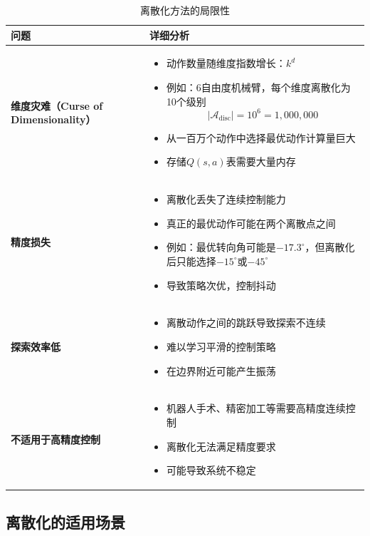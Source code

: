 \begin{table}[H]
\centering
\caption{离散化方法的局限性}
\begin{tabular}{p{}p{}}
\toprule
\textbf{问题} & \textbf{详细分析} \\
\midrule
\textbf{维度灾难（Curse of Dimensionality）} & 
\begin{itemize}
    \item 动作数量随维度指数增长：$k^d$
    \item 例如：6自由度机械臂，每个维度离散化为10个级别
    \[
    |\mathcal{A}_{\text{disc}}| = 10^6 = 1,000,000
    \]
    \item 从一百万个动作中选择最优动作计算量巨大
    \item 存储$Q(s,a)$表需要大量内存
\end{itemize} \\
\hline
\textbf{精度损失} & 
\begin{itemize}
    \item 离散化丢失了连续控制能力
    \item 真正的最优动作可能在两个离散点之间
    \item 例如：最优转向角可能是$-17.3^\circ$，但离散化后只能选择$-15^\circ$或$-45^\circ$
    \item 导致策略次优，控制抖动
\end{itemize} \\
\hline
\textbf{探索效率低} & 
\begin{itemize}
    \item 离散动作之间的跳跃导致探索不连续
    \item 难以学习平滑的控制策略
    \item 在边界附近可能产生振荡
\end{itemize} \\
\hline
\textbf{不适用于高精度控制} & 
\begin{itemize}
    \item 机器人手术、精密加工等需要高精度连续控制
    \item 离散化无法满足精度要求
    \item 可能导致系统不稳定
\end{itemize} \\
\bottomrule
\end{tabular}
\end{table}

\subsection{离散化的适用场景}

